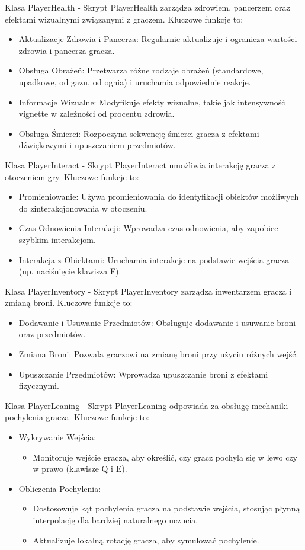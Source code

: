 Klasa PlayerHealth -
Skrypt PlayerHealth zarządza zdrowiem, pancerzem oraz efektami wizualnymi związanymi z graczem. Kluczowe funkcje to:
\begin{itemize}
  \item Aktualizacje Zdrowia i Pancerza: Regularnie aktualizuje i ogranicza wartości zdrowia i pancerza gracza.
  \item Obsługa Obrażeń: Przetwarza różne rodzaje obrażeń (standardowe, upadkowe, od gazu, od ognia) i uruchamia odpowiednie reakcje.
  \item Informacje Wizualne: Modyfikuje efekty wizualne, takie jak intensywność vignette w zależności od procentu zdrowia.
  \item Obsługa Śmierci: Rozpoczyna sekwencję śmierci gracza z efektami dźwiękowymi i upuszczaniem przedmiotów.
\end{itemize}

Klasa PlayerInteract -
Skrypt PlayerInteract umożliwia interakcję gracza z otoczeniem gry. Kluczowe funkcje to:
\begin{itemize}
  \item Promieniowanie: Używa promieniowania do identyfikacji obiektów możliwych do zinterakcjonowania w otoczeniu.
  \item Czas Odnowienia Interakcji: Wprowadza czas odnowienia, aby zapobiec szybkim interakcjom.
  \item Interakcja z Obiektami: Uruchamia interakcje na podstawie wejścia gracza (np. naciśnięcie klawisza F).
\end{itemize}

Klasa PlayerInventory -
Skrypt PlayerInventory zarządza inwentarzem gracza i zmianą broni. Kluczowe funkcje to:
\begin{itemize}
  \item Dodawanie i Usuwanie Przedmiotów: Obsługuje dodawanie i usuwanie broni oraz przedmiotów.
  \item Zmiana Broni: Pozwala graczowi na zmianę broni przy użyciu różnych wejść.
  \item Upuszczanie Przedmiotów: Wprowadza upuszczanie broni z efektami fizycznymi.
\end{itemize}

Klasa PlayerLeaning -
Skrypt PlayerLeaning odpowiada za obsługę mechaniki pochylenia gracza. Kluczowe funkcje to:
\begin{itemize}
  \item Wykrywanie Wejścia:
    \begin{itemize}
      \item Monitoruje wejście gracza, aby określić, czy gracz pochyla się w lewo czy w prawo (klawisze Q i E).
    \end{itemize}
  \item Obliczenia Pochylenia:
    \begin{itemize}
      \item Dostosowuje kąt pochylenia gracza na podstawie wejścia, stosując płynną interpolację dla bardziej naturalnego uczucia.
      \item Aktualizuje lokalną rotację gracza, aby symulować pochylenie.
    \end{itemize}
\end{itemize}

